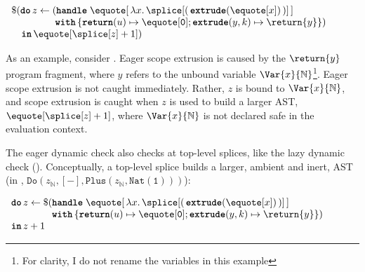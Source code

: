 \begin{code} 
 \begin{source}
  $\begin{array}{l}
      \$(\textbf{\texttt{do}} \, z \leftarrow (\textbf{\texttt{handle}} \; \equote[{\, \lambda x. \,\splice[({{\, \textbf{\texttt{extrude}}(\equote[x]) \,}})]\,}] \\
      \quad\quad\quad\quad\,\; \textbf{\texttt{with}} \, \{ \textbf{\texttt{return}}(u) \mapsto {\equote[\texttt{0}]}; \textbf{\texttt{extrude}}(y, k) \mapsto {\return{y}}\})\\
      \quad \textbf{\texttt{in}} \, \equote[{\splice[z] + 1}])
    \end{array}$
 \end{source}
 \label{listing:eager-scope-extrusion-check-eg}
\end{code}

As an example, consider . Eager scope extrusion is caused by the $\return{y}$ program fragment, where $y$ refers to the unbound variable $\Var{x}{\mathbb{N}}$\footnote{For clarity, I do not rename the variables in this example}. Eager scope extrusion is not caught immediately. Rather, $z$ is bound to $\Var{x}{\mathbb{N}}$, and scope extrusion is caught when $z$ is used to build a larger AST, $\equote[{\splice[z]+1}]$, where $\Var{x}{\mathbb{N}}$ is not declared safe in the evaluation context. 

The eager dynamic check also checks at top-level splices, like the lazy dynamic check (). Conceptually, a top-level splice builds a larger, ambient and inert, AST (in , $\texttt{Do}(z_\mathbb{N}, [-], \texttt{Plus}(z_\mathbb{N}, \texttt{Nat}(\texttt{1})))$):

\begin{code} 
 \begin{source}
  $\begin{array}{l}
      \textbf{\texttt{do}} \, z \leftarrow \$(\textbf{\texttt{handle}} \; \equote[{\, \lambda x. \,\splice[(\,{{ \textbf{\texttt{extrude}}(\equote[x])}}\,)] \,}] \\
      \quad\quad\quad\quad\,\textbf{\texttt{with}} \, \{ \textbf{\texttt{return}}(u) \mapsto {\equote[\texttt{0}]}; \textbf{\texttt{extrude}}(y, k) \mapsto {\return{y}}\})\\
      \textbf{\texttt{in}} \, z + 1
    \end{array}$
 \end{source}
 \label{listing:eager-scope-extrusion-check-eg-tls}
\end{code}

